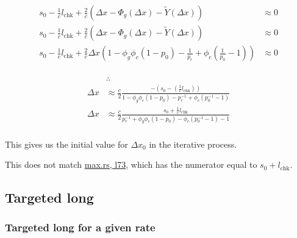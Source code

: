 \begin{equation}\label{approx-solvency}
\begin{aligned}
s_{0} - \tfrac{1}{c} l_{\text{chk}} + \tfrac{2}{c} \left( \Delta x - \Phi_{g}(\Delta x) - \tilde{Y}(\Delta x) \right) &\approx 0 \\
s_{0} - \tfrac{1}{c} l_{\text{chk}} + \tfrac{2}{c} \left( \Delta x - \Phi_{g}(\Delta x) - \tilde{Y}(\Delta x) \right) &\approx 0 \\
s_{0} - \tfrac{1}{c} l_{\text{chk}} + \tfrac{2}{c} \Delta x \left( 1 - \phi_{g}\phi_{c} \left( 1 - p_{0} \right) - \tfrac{1}{p_{r}} + \phi_{c} \left( \tfrac{1}{p_{0}} - 1 \right) \right) &\approx 0 \\
\end{aligned}
\end{equation}

\begin{equation}
\begin{aligned}
&\therefore \\
\Delta x &\approx \tfrac{c}{2} \tfrac{-(s_{0}-(\tfrac{1}{c} l_{\text{chk}}))}{1 - \phi_{g}\phi_{c} \left( 1 - p_{0} \right) - p_{r}^{-1} + \phi_{c} \left( p_{0}^{-1} - 1 \right)} \\
\Delta x &\approx \tfrac{c}{2} \tfrac{s_{0} + \tfrac{1}{c} l_{\text{chk}}}{p_{r}^{-1} + \phi_{g}\phi_{c} \left( 1 - p_{0} \right) - \phi_{c} \left( p_{0}^{-1} - 1 \right) - 1} \\
\end{aligned}
\end{equation}

This gives us the initial value for $\Delta x_{0}$ in the iterative process.

\begin{callout}

This does not match \href{https://github.com/delvtech/hyperdrive/blob/5c12ca877c7dec2da03fac2e033141db8cfeb099/crates/hyperdrive-math/src/long/max.rs#L73}{max.rs, l73}, which has the numerator equal to $s_{0} + l_{\text{chk}}$.

\end{callout}


\subsection{Targeted long}

\subsubsection{Targeted long for a given rate}

